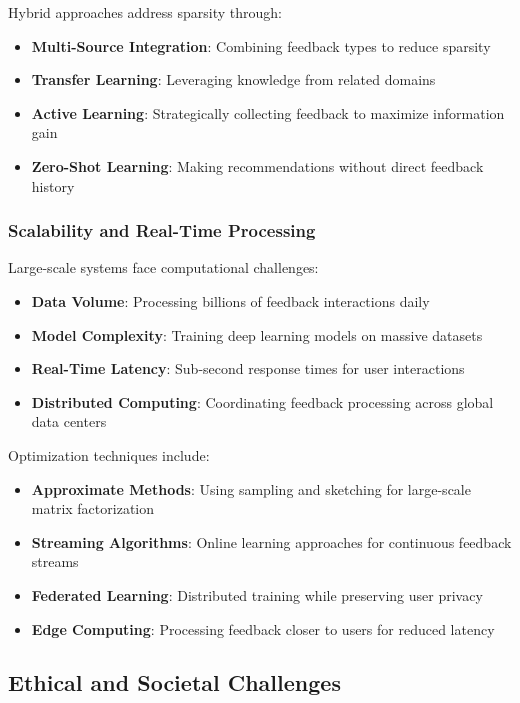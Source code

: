\documentclass[acmsmall,review,anonymous]{acmart}
\begin{document}
Hybrid approaches address sparsity through:
\begin{itemize}
    \item \textbf{Multi-Source Integration}: Combining feedback types to reduce sparsity
    \item \textbf{Transfer Learning}: Leveraging knowledge from related domains
    \item \textbf{Active Learning}: Strategically collecting feedback to maximize information gain
    \item \textbf{Zero-Shot Learning}: Making recommendations without direct feedback history
\end{itemize}

\subsubsection{Scalability and Real-Time Processing}

Large-scale systems face computational challenges:

\begin{itemize}
    \item \textbf{Data Volume}: Processing billions of feedback interactions daily
    \item \textbf{Model Complexity}: Training deep learning models on massive datasets
    \item \textbf{Real-Time Latency}: Sub-second response times for user interactions
    \item \textbf{Distributed Computing}: Coordinating feedback processing across global data centers
\end{itemize}

Optimization techniques include:
\begin{itemize}
    \item \textbf{Approximate Methods}: Using sampling and sketching for large-scale matrix factorization
    \item \textbf{Streaming Algorithms}: Online learning approaches for continuous feedback streams
    \item \textbf{Federated Learning}: Distributed training while preserving user privacy
    \item \textbf{Edge Computing}: Processing feedback closer to users for reduced latency
\end{itemize}

\subsection{Ethical and Societal Challenges}
\end{document}
